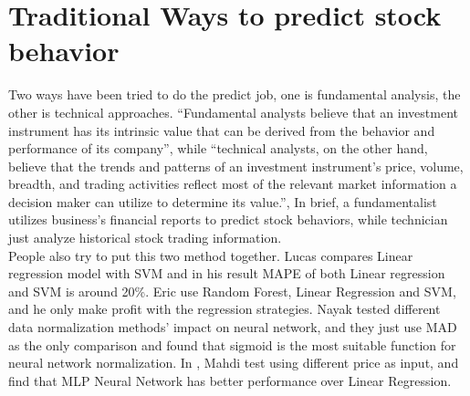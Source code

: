 \section{Traditional Ways to predict stock behavior}

Two ways have been tried to do the predict job, one is fundamental analysis, the other is technical approaches\cite{1_edwardsmagee_1997}. “Fundamental analysts believe that an investment instrument has its intrinsic value that can be derived from the behavior and performance of its company”, while “technical analysts, on the other hand, believe that the trends and patterns of an investment instrument’s price, volume, breadth, and trading activities reflect most of the relevant market information a decision maker can utilize to determine its value.”\cite{lam2004neural}, In brief, a fundamentalist utilizes business’s financial reports to predict stock behaviors, while technician just analyze historical stock trading information.\\

People also try to put this two method together. Lucas\cite{nunnostock} compares Linear regression model with SVM and in his result MAPE of both Linear regression and SVM is around 20\%. Eric\cite{alexanderstock} use Random Forest, Linear Regression and SVM, and he only make profit with the regression strategies. Nayak\cite{nayak2014impact} tested different data normalization methods’ impact on neural network, and they just use MAD as the only comparison and found that sigmoid is the most suitable function for neural network normalization. In \cite{naeini2010stock}, Mahdi test using different price as input, and find that MLP Neural Network has better performance over Linear Regression.
